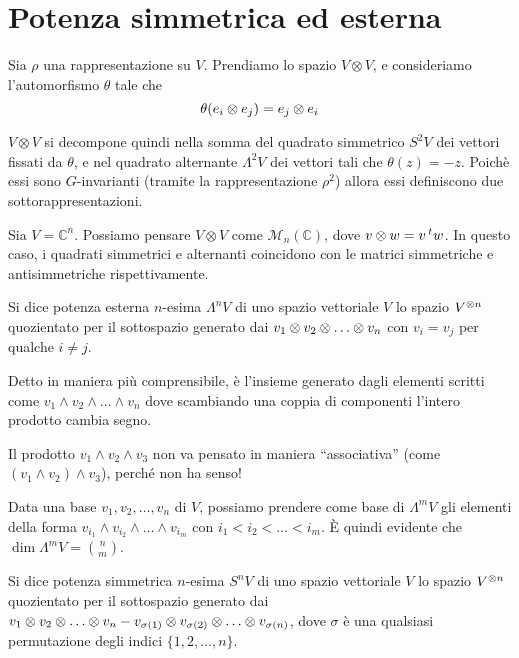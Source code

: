 \section{Potenza simmetrica ed esterna}

\begin{mydef}
  Sia $\rho$ una rappresentazione su $V$. Prendiamo lo spazio $V\otimes V$, e consideriamo l'automorfismo $\theta$ tale che 
  \[
  \theta(e_i \otimes e_j) = e_j \otimes e_i
  \]
  
  $V\otimes V$ si decompone quindi nella somma del quadrato simmetrico $S^2V$ dei vettori fissati da $\theta$, e nel quadrato alternante $\Lambda^2V$ dei vettori tali che $\theta(z) = -z$. Poichè essi sono $G$-invarianti (tramite la rappresentazione $\rho^2$) allora essi definiscono due sottorappresentazioni.
\end{mydef}

\begin{myexample}
  Sia $V=\mathbb C^n$. Possiamo pensare $V\otimes V$ come $\mathcal M_n(\mathbb C)$, dove $v \otimes w = v\prescript{t}{}{w}$. In questo caso, i quadrati simmetrici e alternanti coincidono con le matrici simmetriche e antisimmetriche rispettivamente.
\end{myexample}

\begin{mydef}
  Si dice potenza esterna $n$-esima $\Lambda^nV$  di uno spazio vettoriale $V$ lo spazio $V^{\otimes n}$ quozientato per il sottospazio generato dai $v_1 \tensor v_2 \tensor \dots \tensor v_n$ con $v_i=v_j$ per qualche $i\ne j$.  
\end{mydef}

Detto in maniera più comprensibile, è l'insieme generato dagli elementi scritti come $v_1 \wedge v_2 \wedge \dots \wedge v_n$ dove scambiando una coppia di componenti l'intero prodotto cambia segno.

\begin{Achtung}
  Il prodotto $v_1 \wedge v_2 \wedge v_3$ non va pensato in maniera ``associativa'' (come $(v_1 \wedge v_2) \wedge v_3$), perché non ha senso!
\end{Achtung}

Data una base $v_1,v_2,\dots,v_n$ di $V$, possiamo prendere
come base di $\Lambda^mV$ gli elementi della forma $v_{i_1}\wedge v_{i_2}\wedge\dots\wedge v_{i_m}$ con $i_1<i_2<\dots<i_m$. \`E quindi evidente che $\dim \Lambda^mV=\binom nm$.    
  
\begin{mydef}
  Si dice potenza simmetrica $n$-esima $S^nV$  di uno spazio vettoriale $V$ lo spazio $V^{\otimes n}$ quozientato per il sottospazio generato dai $v_1 \tensor v_2 \tensor \dots \tensor v_n - v_{\sigma(1)} \tensor v_{\sigma(2)} \tensor \dots \tensor v_{\sigma(n)}$, dove $\sigma$ è una qualsiasi permutazione degli indici $\{1,2,\dots,n\}$.  
\end{mydef}

